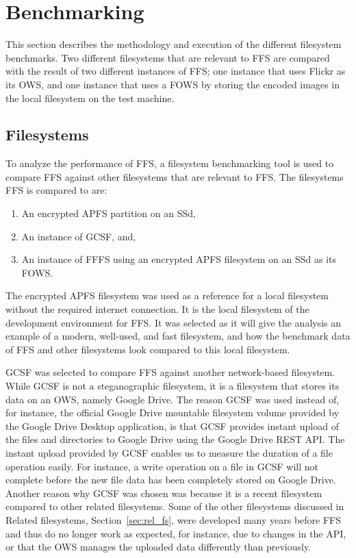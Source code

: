 \section{Benchmarking}
This section describes the methodology and execution of the different filesystem benchmarks. Two different filesystems that are relevant to \gls{FFS} are compared with the result of two different instances of \gls{FFS}; one instance that uses Flickr as its \gls{OWS}, and one instance that uses a \gls{FOWS} by storing the encoded images in the local filesystem on the test machine.

\subsection{Filesystems}
To analyze the performance of \gls{FFS}, a filesystem benchmarking tool is used to compare \gls{FFS} against other filesystems that are relevant to \gls{FFS}. The filesystems \gls{FFS} is compared to are:
\begin{enumerate}
	\item An encrypted \gls{APFS} partition on an SSd,
	\item An instance of \gls{GCSF}, and,
	\item An instance of \gls{FFFS} using an encrypted \gls{APFS} filesystem on an SSd as its \gls{FOWS}.
\end{enumerate}
The encrypted \gls{APFS} filesystem was used as a reference for a local filesystem without the required internet connection. It is the local filesystem of the development environment for \gls{FFS}. It was selected as it will give the analysis an example of a modern, well-used, and fast filesystem, and how the benchmark data of \gls{FFS} and other filesystems look compared to this local filesystem.

GCSF was selected to compare \gls{FFS} against another network-based filesystem. While \gls{GCSF} is not a steganographic filesystem, it is a filesystem that stores its data on an \gls{OWS}, namely Google Drive. The reason \gls{GCSF} was used instead of, for instance, the official Google Drive mountable filesystem volume provided by the Google Drive Desktop application, is that \gls{GCSF} provides instant upload of the files and directories to Google Drive using the Google Drive REST \gls{API}. The instant upload provided by \gls{GCSF} enables us to measure the duration of a file operation easily. For instance, a write operation on a file in \gls{GCSF} will not complete before the new file data has been completely stored on Google Drive. Another reason why \gls{GCSF} was chosen was because it is a recent filesystem compared to other related filesystems. Some of the other filesystems discussed in Related filesystems, Section~\ref{sec:rel_fs}, were developed many years before \gls{FFS} and thus do no longer work as expected, for instance, due to changes in the \gls{API}, or that the \gls{OWS} manages the uploaded data differently than previously.

